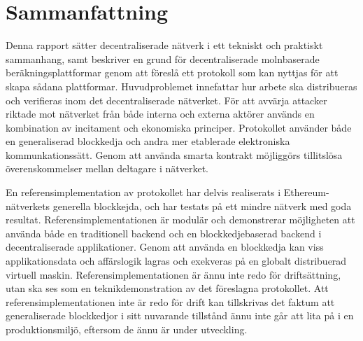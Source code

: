 
\thispagestyle{plain}			%
\section*{Sammanfattning}
Denna rapport sätter decentraliserade nätverk i ett tekniskt och praktiskt sammanhang, samt beskriver en grund för decentraliserade molnbaserade beräkningsplattformar genom att föreslå ett protokoll som kan nyttjas för att skapa sådana plattformar. Huvudproblemet innefattar hur arbete ska distribueras och verifieras inom det decentraliserade nätverket. För att avvärja attacker riktade mot nätverket från både interna och externa aktörer används en kombination av incitament och ekonomiska principer. Protokollet använder både en generaliserad blockkedja och andra mer etablerade elektroniska kommunkationssätt. Genom att använda smarta kontrakt möjliggörs tillitslösa överenskommelser mellan deltagare i nätverket.

En referensimplementation av protokollet har delvis realiserats i Ethereum-nätverkets generella blockkejda, och har testats på ett mindre nätverk med goda resultat. Referensimplementationen är modulär och demonstrerar möjligheten att använda både en traditionell backend och en blockkedjebaserad backend i decentraliserade applikationer. Genom att använda en blockkedja kan viss applikationsdata och affärslogik lagras och exekveras på en globalt distribuerad virtuell maskin. Referensimplementationen är ännu inte redo för driftsättning, utan ska ses som en teknikdemonstration av det föreslagna protokollet. Att referensimplementationen inte är redo för drift kan tillskrivas det faktum att generaliserade blockkedjor i sitt nuvarande tillstånd ännu inte går att lita på i en produktionsmiljö, eftersom de ännu är under utveckling.

\newpage				%
\thispagestyle{empty}
\mbox{}